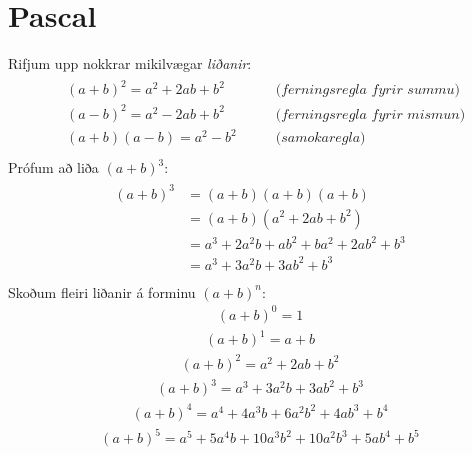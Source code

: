 \documentclass[a4paper,10pt,icelandic]{sphinxmanual}
\begin{document}
\section{Pascal}
\label{\detokenize{Kafli06:pascal}}
Rifjum upp nokkrar mikilvægar \textit{liðanir}:
\begin{equation*}
\begin{split}\begin{aligned}
& (a+b)^2=a^2+2ab+b^2 \qquad &\textit{(ferningsregla fyrir summu)} \\
& (a-b)^2=a^2-2ab+b^2 \qquad &\textit{(ferningsregla fyrir mismun)} \\
& (a+b)(a-b)=a^2-b^2 \qquad &\textit{(samokaregla)} \\
\end{aligned}\end{split}
\end{equation*}
Prófum að liða \((a+b)^3\):
\begin{equation*}
\begin{split}\begin{aligned}
(a+b)^3 &= (a+b)(a+b)(a+b) \\
&= (a+b)(a^2+2ab+b^2) \\
&= a^3 + 2a^2b +ab^2 +ba^2 +2ab^2 + b^3\\
&=a^3+3a^2b+3ab^2+b^3\\
\end{aligned}\end{split}
\end{equation*}
Skoðum fleiri liðanir á forminu \((a + b)^n\):
\begin{equation*}
\begin{split}(a + b)^0 = 1\end{split}
\end{equation*}\begin{equation*}
\begin{split}(a + b)^1 = a + b\end{split}
\end{equation*}\begin{equation*}
\begin{split}(a + b)^2 = a^2 + 2ab + b^2\end{split}
\end{equation*}\begin{equation*}
\begin{split}(a + b)^3 = a^3 + 3a^2 b + 3a b^2 + b^3\end{split}
\end{equation*}\begin{equation*}
\begin{split}(a + b)^4 = a^4 + 4 a^3 b + 6a^2 b^2 + 4ab^3 + b^4\end{split}
\end{equation*}\begin{equation*}
\begin{split}(a + b)^5 = a^5 + 5a^4 b + 10a^3b^2 + 10a^2 b^3 + 5 ab^4 +b^5\end{split}
\end{equation*}
\end{document}
